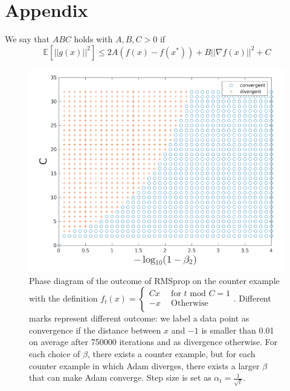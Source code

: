 \documentclass{article}
\begin{document}
%
\newpage
\appendix
\section{Appendix}\label{app:Appendix}
We say that $ABC$ holds with $A,B,C > 0$ if
\begin{equation}\label{eqA1}
	\mathbb{E}\left[||g(x)||^2\right] \leq 2A(f(x) - f(x^*)) + B||\nabla f(x)||^2 + C\tag{A.1}
\end{equation}
\begin{figure}[h]
\label{fig1}
\centering
\includegraphics[scale = 0.4]{rmsp.png}
\caption{Phase diagram of the outcome of RMSprop on the counter example with the definition
			\(f_t(x) =
	\begin{cases}
		Cx & \ \ \text{for $t$ mod $C = 1$}\\
		-x & \ \ \text{Otherwise}\\
	\end{cases}
	\). 
	Different marks represent
	different outcome: we label a data point as convergence if the distance between $x$ and $-1$ is smaller than 0.01
	on average after 750000 iterations and as divergence otherwise. For each choice of $\beta$, there exists a counter
	example, but for each counter example in which Adam diverges, there exists a larger $\beta$ that can make Adam
	converge. Step size is set as $\alpha_t = \frac{1}{\sqrt{t}}$.}
\end{figure}
\end{document}
